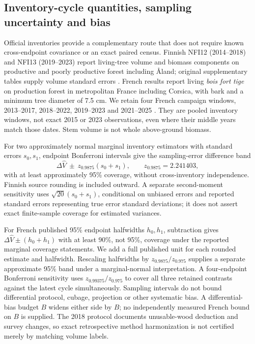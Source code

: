 \subsection{Inventory-cycle quantities, sampling uncertainty and bias}\label{sec:inventorymethods}
Official inventories provide a complementary route that does not require known cross-endpoint covariance or an exact paired census. Finnish NFI12 (2014--2018) and NFI13 (2019--2023) report living-tree volume and biomass components on productive and poorly productive forest including \AA land; original supplementary tables supply volume standard errors \citep{Korhonen2021,Korhonen2024}. French results report living \emph{bois fort tige} on production forest in metropolitan France including Corsica, with bark and a minimum tree diameter of 7.5 cm. We retain four French campaign windows, 2013--2017, 2018--2022, 2019--2023 and 2021--2025 \citep{IGN2018,IGN2026}. They are pooled inventory windows, not exact 2015 or 2023 observations, even where their middle years match those dates. Stem volume is not whole above-ground biomass.

For two approximately normal marginal inventory estimators with standard errors $s_0,s_1$, endpoint Bonferroni intervals give the sampling-error difference band
\begin{equation}
\Delta\widehat V\ \pm\ z_{0.9875}(s_0+s_1),\qquad z_{0.9875}=2.241403,\label{eq:invbonf}
\end{equation}
with at least approximately 95\% coverage, without cross-inventory independence. Finnish source rounding is included outward. A separate second-moment sensitivity uses $\sqrt{20}(s_0+s_1)$, conditional on unbiased errors and reported standard errors representing true error standard deviations; it does not assert exact finite-sample coverage for estimated variances.

For French published 95\% endpoint halfwidths $h_0,h_1$, subtraction gives $\Delta\widehat V\pm(h_0+h_1)$ with at least 90\%, not 95\%, coverage under the reported marginal coverage statements. We add a full published unit for each rounded estimate and halfwidth. Rescaling halfwidths by $z_{0.9875}/z_{0.975}$ supplies a separate approximate 95\% band under a marginal-normal interpretation. A four-endpoint Bonferroni sensitivity uses $z_{0.99375}/z_{0.975}$ to cover all three retained contrasts against the latest cycle simultaneously. Sampling intervals do not bound differential protocol, cubage, projection or other systematic bias. A differential-bias budget $B$ widens either side by $B$; no independently measured French bound on $B$ is supplied. The 2018 protocol documents unusable-wood deduction and survey changes, so exact retrospective method harmonization is not certified merely by matching volume labels.

